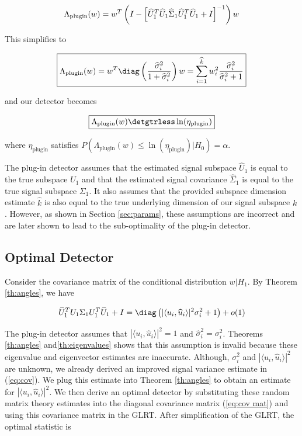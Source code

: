 \begin{equation*}
\Lambda_{\text{plugin}}(w)= w^T\left(I-\left[\widehat{U}_1^T\widehat{U}_1\widehat{\Sigma}_1\widehat{U}_1^T\widehat{U}_1 + I\right]^{-1}\right)w\\
\end{equation*}

This simplifies to

\begin{equation}\label{eq:plugin stat}
\boxed{\Lambda_{\text{plugin}}(w) = w^T\diag\left(\frac{\widehat{\sigma}^2_i}{1+\widehat{\sigma}^2_i}\right)w=\sum_{i=1}^{\widehat{k}}w_i^2\frac{\widehat{\sigma}_i^2}{\widehat{\sigma}_i^2+1}}
\end{equation}

and our detector becomes

\begin{equation}\label{eq:plugin classifier}
\boxed{\Lambda_{\text{plugin}}(w) \detgtrless \ln(\eta_{\text{plugin}})}
\end{equation}

where $\eta_{\text{plugin}}$ satisfies $P(\Lambda_{\text{plugin}}(w)\leq\ln\left(\eta_{\text{plugin}}\right)|H_0)=\alpha$.

The plug-in detector assumes that the estimated signal subspace $\widehat{U}_1$ is equal to the true subspace $U_1$ and that the estimated signal covariance $\widehat{\Sigma}_1$ is equal to the true signal subspace $\Sigma_1$. It also assumes that the provided subspace dimension estimate $\widehat{k}$ is also equal to the true underlying dimension of our signal subspace $k$. However, as shown in Section \ref{sec:params}, these assumptions are incorrect and are later shown to lead to the sub-optimality of the plug-in detector.

\subsection{Optimal Detector}\label{sec:optimal}

Consider the covariance matrix of the conditional distribution $w|H_1$. By Theorem \ref{th:angles}, we have

\begin{equation}\label{eq:cov mat}
\widehat{U}_1^TU_1\Sigma_1 U_1^T\widehat{U}_1+I = \diag\left(|\langle u_i,\widehat{u}_i\rangle|^2\sigma_i^2 + 1\right) + o(1)
\end{equation}

The plug-in detector assumes that $|\langle u_i,\widehat{u}_i\rangle|^2=1$ and $\widehat{\sigma}_i^2=\sigma_i^2$. Theorems \ref{th:angles} and\ref{th:eigenvalues} shows that this assumption is invalid because these eigenvalue and eigenvector estimates are inaccurate. Although, $\sigma_i^2$ and $|\langle u_i,\widehat{u}_i\rangle|^2$ are unknown, we already derived an improved signal variance estimate in (\ref{eq:cov}). We plug this estimate into Theorem \ref{th:angles} to obtain an estimate for $|\langle u_i,\widehat{u}_i\rangle|^2$. We then derive an optimal detector by substituting these random matrix theory estimates into the diagonal covariance matrix (\ref{eq:cov mat}) and using this covariance matrix in the GLRT. After simplification of the GLRT, the optimal statistic is

